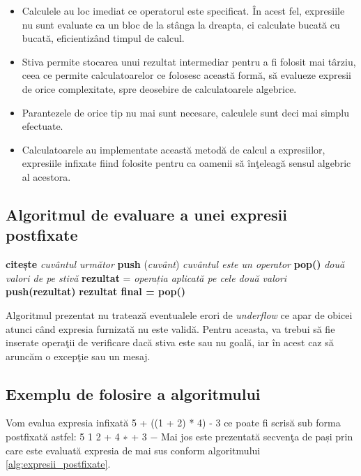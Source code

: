 \begin{itemize}
	\item Calculele au loc imediat ce operatorul este specificat. În acest fel, expresiile nu sunt evaluate ca un bloc de la stânga la dreapta, ci calculate bucată cu bucată, eficientizând timpul de
	calcul.
	\item Stiva permite stocarea unui rezultat intermediar pentru a fi folosit mai târziu, ceea ce permite calculatoarelor ce folosesc această formă, să evalueze expresii de orice complexitate, spre deosebire de calculatoarele algebrice.
	\item Parantezele de orice tip nu mai sunt necesare, calculele sunt deci mai simplu efectuate.
	\item Calculatoarele au implementate această metodă de calcul a expresiilor, expresiile infixate fiind folosite pentru ca oamenii să înţeleagă sensul algebric al acestora.
\end{itemize}

\subsection{Algoritmul de evaluare a unei expresii postfixate}

\begin{algorithm} [H]
	\caption{}\label{alg:expresii_postfixate}
	\begin{algorithmic}[1]
		\State \textbf{citește} \textit{cuvântul următor}	
		\State \textbf{push} (\textit{cuvânt})	
		\Else \textit{ cuvântul este un operator}
		\State \textbf{pop()} \textit{două valori de pe stivă}
		\State \textbf{rezultat} = \textit{operația aplicată pe cele două valori}
		\State \textbf{push(rezultat)}
		\EndIf		
		\EndWhile
		\State \textbf{rezultat final = pop()}			
	\end{algorithmic}
\end{algorithm}

Algoritmul prezentat nu tratează eventualele erori de \textit{underflow} ce apar de obicei atunci când expresia furnizată nu este validă. Pentru aceasta, va trebui să fie inserate operaţii de verificare dacă stiva este sau nu goală, iar în acest caz să aruncăm o excepţie sau un mesaj.

\subsection{Exemplu de folosire a algoritmului}

Vom evalua expresia infixată 5 + ((1 + 2) * 4) - 3 ce poate fi scrisă sub forma
postfixată astfel:
 5 1 2 + 4 ∗ + 3 −
Mai jos este prezentată secvenţa de pași prin care este evaluată expresia de mai sus
conform algoritmului \ref{alg:expresii_postfixate}.
